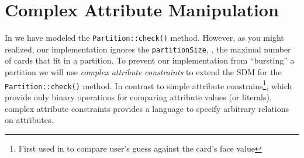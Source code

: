 \newpage
\section{Complex Attribute Manipulation}
\genHeader


In  we have modeled the \texttt{Partition::check()} method.
However, as you might realized, our implementation ignores the \texttt{partitionSize}, \idest, the maximal number of cards that fit in a partition.
To prevent our implementation from \enquote{bursting} a partition we will use \emph{complex attribute constraints} to extend the SDM for the \texttt{Partition::check()} method. 
In contrast to simple attribute constrains\footnote{First used in  to compare user’s guess against the card's face value}, which provide only binary operations for comparing attribute values (or literals), complex attribute constraints provides a language to specify arbitrary relations on attributes.

